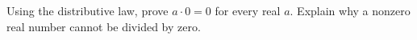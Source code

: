 Using the distributive law, prove $a\cdot0=0$ for every real $a$. Explain why a nonzero real number cannot be divided by zero.
